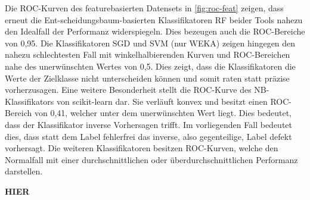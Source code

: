 Die ROC-Kurven des featurebasierten Datensets in \autoref{fig:roc-feat} zeigen, dass erneut die Ent-scheidungsbaum-basierten Klassifikatoren RF beider Tools nahezu den Idealfall der Performanz widerspiegeln. Dies bezeugen auch die ROC-Bereiche von 0,95. Die Klassifikatoren SGD und SVM (nur WEKA) zeigen hingegen den nahezu schlechtesten Fall mit winkelhalbierenden Kurven und ROC-Bereichen nahe des unerwünschten Wertes von 0,5. Dies zeigt, dass die Klassifikatoren die Werte der Zielklasse nicht unterscheiden können und somit \glqq raten\grqq{} statt präzise vorherzusagen. Eine weitere Besonderheit stellt die ROC-Kurve des NB-Klassifikators von scikit-learn dar. Sie verläuft konvex und besitzt einen ROC-Bereich von 0,41, welcher unter dem unerwünschten Wert liegt. Dies bedeutet, dass der Klassifikator inverse Vorhersagen trifft. Im vorliegenden Fall bedeutet dies, dass statt dem Label \glqq fehlerfrei\grqq{} das inverse, also gegenteilige, Label \glqq defekt\grqq{} vorhersagt. Die weiteren Klassifikatoren besitzen ROC-Kurven, welche den Normalfall mit einer durchschnittlichen oder überdurchschnittlichen Performanz darstellen.

\textbf{HIER}

